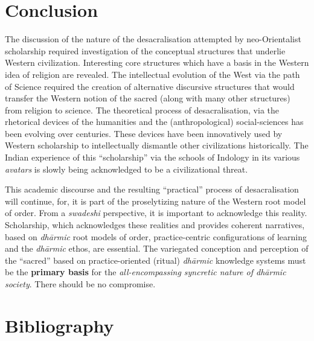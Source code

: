 \section*{Conclusion}

The discussion of the nature of the desacralisation attempted by neo-Orientalist scholarship required investigation of the conceptual structures that underlie Western civilization. Interesting core structures which have a basis in the Western idea of religion are revealed. The intellectual evolution of the West via the path of Science required the creation of alternative discursive structures that would transfer the Western notion of the sacred (along with many other structures) from religion to science. The theoretical process of desacralisation, via the rhetorical devices of the humanities and the (anthropological) social-sciences has been evolving over centuries. These devices have been innovatively used by Western scholarship to intellectually dismantle other civilizations historically. The Indian experience of this “scholarship” via the schools of Indology in its various \textit{avatars} is slowly being acknowledged to be a civilizational threat. 

This academic discourse and the resulting “practical” process of desacralisation will continue, for, it is part of the proselytizing nature of the Western root model of order. From a \textit{swadeshi} perspective, it is important to acknowledge this reality. Scholarship, which acknowledges these realities and provides coherent narratives, based on \textit{dhārmic} root models of order, practice-centric configurations of learning and the \textit{dhārmic} ethos, are essential. The variegated conception and perception of the “sacred” based on practice-oriented (ritual) \textit{dhārmic} knowledge systems must be the \textbf{primary basis} for the\textit{ all-encompassing syncretic nature of dhārmic society}. There should be no compromise.


\section*{Bibliography}

